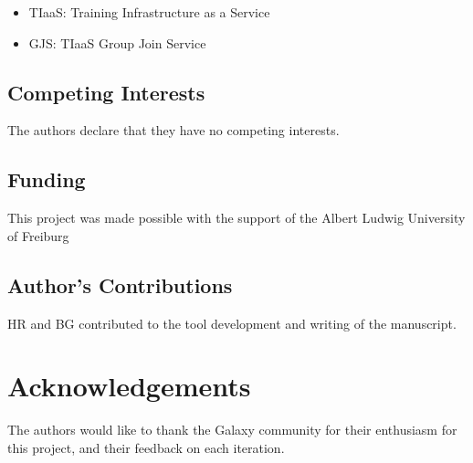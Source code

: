\documentclass[a4paper,num-refs]{oup-contemporary}
\begin{document}
\begin{itemize}
\item TIaaS: Training Infrastructure as a Service
\item GJS: TIaaS Group Join Service
\end{itemize}


\subsection{Competing Interests}

The authors declare that they have no competing interests.


\subsection{Funding}
This project was made possible with the support of the Albert Ludwig University of Freiburg

\subsection{Author's Contributions}
HR and BG contributed to the tool development and writing of the manuscript.

\section{Acknowledgements}
The authors would like to thank the Galaxy community for their enthusiasm for this project, and their feedback on each iteration.


\end{document}
